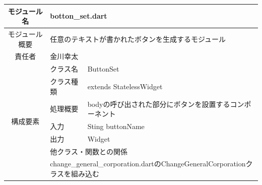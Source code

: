 \clearpage
\begin{table}[H]
  \centering
  \begin{tabular}{|c|l|l|} \hline
    モジュール名                & \multicolumn{2}{l|}{botton\_set.dart}                                                                                                                    \\ \hline
    モジュール概要               & \multicolumn{2}{p{12cm}|}{任意のテキストが書かれたボタンを生成するモジュール}                                                                                                      \\ \hline
    責任者                   & \multicolumn{2}{l|}{金川幸太}                                                                                                                                \\ \hline
    \multirow{7}{*}{構成要素} & クラス名                                                                                          & ButtonSet                                                \\ \cline{2-3}
                          & クラス種類                                                                                         & extends StatelessWidget                                  \\ \cline{2-3}
                          & 処理概要                                                                                          & \multicolumn{1}{p{12cm}|}{bodyの呼び出された部分にボタンを設置するコンポーネント} \\ \cline{2-3}
                          & 入力                                                                                            & Sting buttonName                                         \\ \cline{2-3}
                          & 出力                                                                                            & Widget                                                   \\ \cline{2-3}
                          & \multicolumn{2}{l|}{他クラス・関数との関係}                                                                                                                         \\ \cline{2-3}
                          & \multicolumn{2}{p{14cm}|}{change\_general\_corporation.dartのChangeGeneralCorporationクラスを組み込む}                                                            \\ \hline
  \end{tabular}
\end{table}


